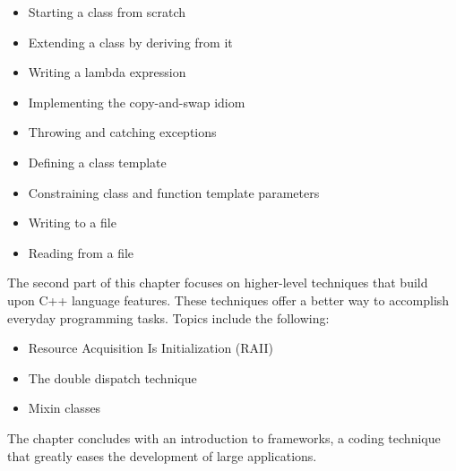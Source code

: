 \begin{itemize}
\item
Starting a class from scratch

\item
Extending a class by deriving from it

\item
Writing a lambda expression

\item
Implementing the copy-and-swap idiom

\item
Throwing and catching exceptions

\item
Defining a class template

\item
Constraining class and function template parameters

\item
Writing to a file

\item
Reading from a file
\end{itemize}

The second part of this chapter focuses on higher-level techniques that build upon C++ language features. These techniques offer a better way to accomplish everyday programming tasks. Topics include the following:

\begin{itemize}
\item
Resource Acquisition Is Initialization (RAII)

\item
The double dispatch technique

\item
Mixin classes
\end{itemize}

The chapter concludes with an introduction to frameworks, a coding technique that greatly eases the development of large applications.
















